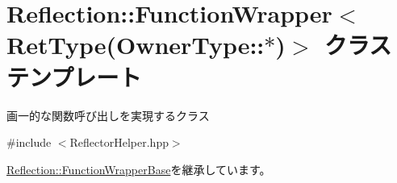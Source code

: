 \hypertarget{class_reflection_1_1_function_wrapper_3_01_ret_type_07_owner_type_1_1_5_08_4}{}\section{Reflection\+:\+:Function\+Wrapper$<$ Ret\+Type(Owner\+Type\+:\+:$\ast$)$>$ クラステンプレート}
\label{class_reflection_1_1_function_wrapper_3_01_ret_type_07_owner_type_1_1_5_08_4}


画一的な関数呼び出しを実現するクラス 




{\ttfamily \#include $<$Reflector\+Helper.\+hpp$>$}



\hyperlink{class_reflection_1_1_function_wrapper_base}{Reflection\+::\+Function\+Wrapper\+Base}を継承しています。

